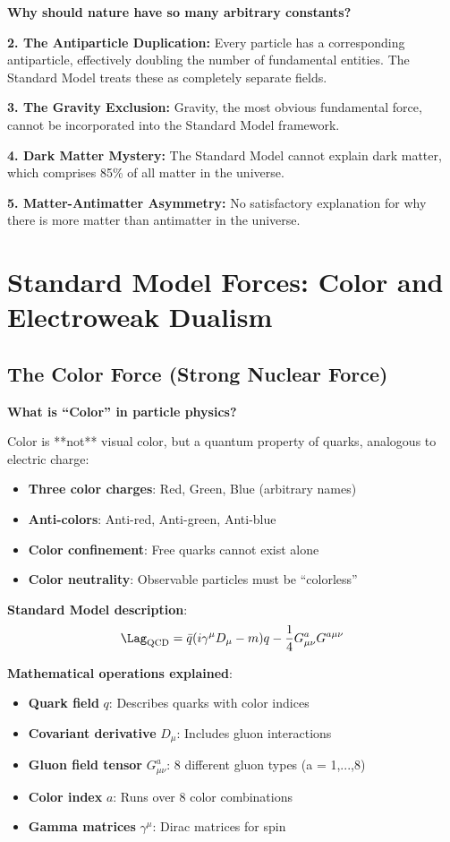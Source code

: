	\textbf{Why should nature have so many arbitrary constants?}
	
	\textbf{2. The Antiparticle Duplication:}
	Every particle has a corresponding antiparticle, effectively doubling the number of fundamental entities. The Standard Model treats these as completely separate fields.
	
	\textbf{3. The Gravity Exclusion:}
	Gravity, the most obvious fundamental force, cannot be incorporated into the Standard Model framework.
	
	\textbf{4. Dark Matter Mystery:}
	The Standard Model cannot explain dark matter, which comprises 85\% of all matter in the universe.
	
	\textbf{5. Matter-Antimatter Asymmetry:}
	No satisfactory explanation for why there is more matter than antimatter in the universe.
	
	\section{Standard Model Forces: Color and Electroweak Dualism}
	
	\subsection{The Color Force (Strong Nuclear Force)}
	
	\textbf{What is ``Color'' in particle physics?}
	
	Color is **not** visual color, but a quantum property of quarks, analogous to electric charge:
	
	\begin{itemize}
		\item \textbf{Three color charges}: Red, Green, Blue (arbitrary names)
		\item \textbf{Anti-colors}: Anti-red, Anti-green, Anti-blue
		\item \textbf{Color confinement}: Free quarks cannot exist alone
		\item \textbf{Color neutrality}: Observable particles must be ``colorless''
	\end{itemize}
	
	\textbf{Standard Model description}:
	\begin{equation}
		\Lag_{\text{QCD}} = \bar{q} (i\gamma^\mu D_\mu - m) q - \frac{1}{4} G_{\mu\nu}^a G^{a\mu\nu}
	\end{equation}
	
	\textbf{Mathematical operations explained}:
	\begin{itemize}
		\item \textbf{Quark field} $q$: Describes quarks with color indices
		\item \textbf{Covariant derivative} $D_\mu$: Includes gluon interactions
		\item \textbf{Gluon field tensor} $G_{\mu\nu}^a$: 8 different gluon types (a = 1,...,8)
		\item \textbf{Color index} $a$: Runs over 8 color combinations
		\item \textbf{Gamma matrices} $\gamma^\mu$: Dirac matrices for spin
	\end{itemize}
	
